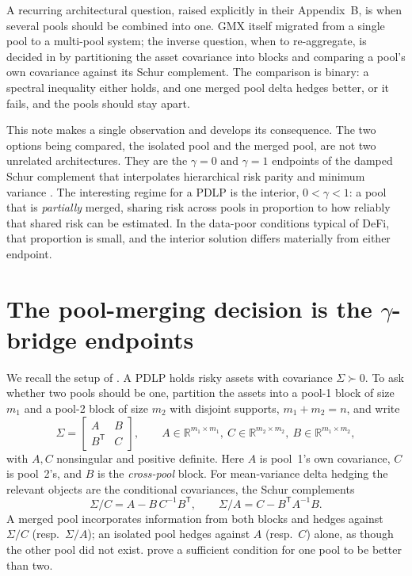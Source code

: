 \documentclass[11pt]{article}
\theoremstyle{definition}
\newcommand{\R}{\mathbb{R}}
\newcommand{\Sig}{\Sigma}
\newcommand{\T}{^{\mathsf{T}}}
\begin{document}
A recurring architectural question, raised explicitly in their Appendix~B, is
when several pools should be combined into one. GMX itself migrated from a single
pool to a multi-pool system; the inverse question, when to re-aggregate, is
decided in \citet{chitra2025} by partitioning the asset covariance into blocks and
comparing a pool's own covariance against its Schur complement. The comparison is
binary: a spectral inequality either holds, and one merged pool delta hedges
better, or it fails, and the pools should stay apart.

This note makes a single observation and develops its consequence. The two
options being compared, the isolated pool and the merged pool, are not two
unrelated architectures. They are the $\gamma=0$ and $\gamma=1$ endpoints of the
damped Schur complement that interpolates hierarchical risk parity and minimum
variance \citep{cotton2024,cotton2022}. The interesting regime for a PDLP is the
interior, $0<\gamma<1$: a pool that is \emph{partially} merged, sharing risk
across pools in proportion to how reliably that shared risk can be estimated. In
the data-poor conditions typical of DeFi, that proportion is small, and the
interior solution differs materially from either endpoint.

\section{The pool-merging decision is the \texorpdfstring{$\gamma$}{gamma}-bridge endpoints}

We recall the setup of \citet[App.~B]{chitra2025}. A PDLP holds risky assets with
covariance $\Sig \succ 0$. To ask whether two pools should be one, partition the
assets into a pool-1 block of size $m_1$ and a pool-2 block of size $m_2$ with
disjoint supports, $m_1+m_2=n$, and write
\begin{equation}
  \Sig = \begin{bmatrix} A & B \\ B\T & C \end{bmatrix},
  \qquad A\in\R^{m_1\times m_1},\ C\in\R^{m_2\times m_2},\ B\in\R^{m_1\times m_2},
\end{equation}
with $A,C$ nonsingular and positive definite. Here $A$ is pool~1's own
covariance, $C$ is pool~2's, and $B$ is the \emph{cross-pool} block. For
mean-variance delta hedging the relevant objects are the conditional covariances,
the Schur complements
\begin{equation}
  \Sig/C = A - B\,C^{-1}B\T, \qquad \Sig/A = C - B\T A^{-1} B .
\end{equation}
A merged pool incorporates information from both blocks and hedges against
$\Sig/C$ (resp.\ $\Sig/A$); an isolated pool hedges against $A$ (resp.\ $C$)
alone, as though the other pool did not exist. \citet{chitra2025} prove a
sufficient condition for one pool to be better than two.
\end{document}
